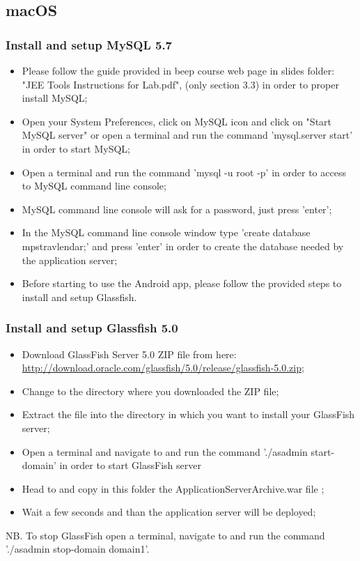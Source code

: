 \subsection{macOS}
\label{subsect:macOS}

\subsubsection{Install and setup MySQL 5.7}
\begin{itemize}
	\item Please follow the guide provided in beep course web page in slides folder: "JEE Tools Instructions for Lab.pdf", (only section 3.3) in order to proper install MySQL;
	\item Open your System Preferences, click on MySQL icon and click on "Start MySQL server" or open a terminal and run the command 'mysql.server start' in order to start MySQL;
	\item Open a terminal and run the command 'mysql -u root -p' in order to access to MySQL command line console;
	\item MySQL command line console will ask for a password, just press 'enter';
	\item In the MySQL command line console window type 'create database mps\textunderscore travlendar;' and press 'enter' in order to create the database needed by the application server;
	\item Before starting to use the Android app, please follow the provided steps to install and setup Glassfish.
\end{itemize}

\subsubsection{Install and setup Glassfish 5.0}
\begin{itemize}
	\item Download GlassFish Server 5.0 ZIP file from here: \\ \href{http://download.oracle.com/glassfish/5.0/release/glassfish-5.0.zip}{\color{blue}http://download.oracle.com/glassfish/5.0/release/glassfish-5.0.zip};
	\item Change to the directory where you downloaded the ZIP file;
	\item Extract the file into the directory in which you want to install your GlassFish server;
	\item Open a terminal and navigate to  and run the command './asadmin start-domain' in order to start GlassFish server
	\item Head to  and copy in this folder the ApplicationServerArchive.war file ;
	\item Wait a few seconds and than the application server will be deployed;
\end{itemize}
NB. To stop GlassFish open a terminal, navigate to  and run the command './asadmin stop-domain domain1'.

